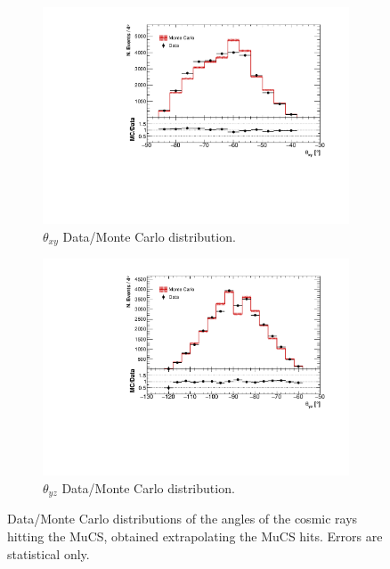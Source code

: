 \documentclass[a4paper]{scrartcl}
\begin{document}
\begin{figure}[htbp]
\begin{subfigure}{0.52\textwidth}
\includegraphics[width=\linewidth]{figures/xy_mucs.pdf}
\caption{$\theta_{xy}$ Data/Monte Carlo distribution.} \label{fig:xy_mucs}
\end{subfigure}
\begin{subfigure}{0.52\textwidth}
\includegraphics[width=\linewidth]{figures/yz_mucs.pdf}
\caption{$\theta_{yz}$ Data/Monte Carlo distribution.} \label{fig:yzmucs}
\end{subfigure}
\caption{Data/Monte Carlo distributions of the angles of the cosmic rays hitting the MuCS, obtained extrapolating the MuCS hits. Errors are statistical only.} \label{fig:mucs_angles}


\end{figure}
\end{document}
